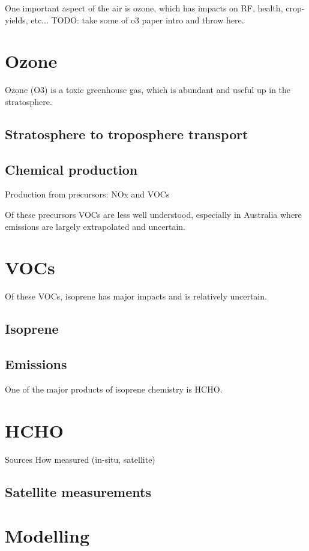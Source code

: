     One important aspect of the air is ozone, which has impacts on RF, health, crop-yields, etc...
    TODO: take some of o3 paper intro and throw here.
\section{Ozone}
\label{LR:O3}
  Ozone (O3) is a toxic greenhouse gas, which is abundant and useful up in the stratosphere.
  
  
  
  \subsection{Stratosphere to troposphere transport}

  
  \subsection{Chemical production}
    Production from precursors: NOx and VOCs
    
    
    Of these precursors VOCs are less well understood, especially in Australia where emissions are largely extrapolated and uncertain.

\section{VOCs}
\label{LR:VOCs}
  
  
  Of these VOCs, isoprene has major impacts and is relatively uncertain.
  
  \subsection{Isoprene}
  \label{LR:VOCs:Isop}
    
    
  \subsection{Emissions}
  \label{LR:VOCs:Emissions}
    
  
    One of the major products of isoprene chemistry is HCHO.
  
\section{HCHO}
\label{LR:HCHO}
  Sources
  How measured (in-situ, satellite)
  
  \subsection{Satellite measurements}
  \label{LR:HCHO:Sat}
  
\section{Modelling}
\label{LR:Models}